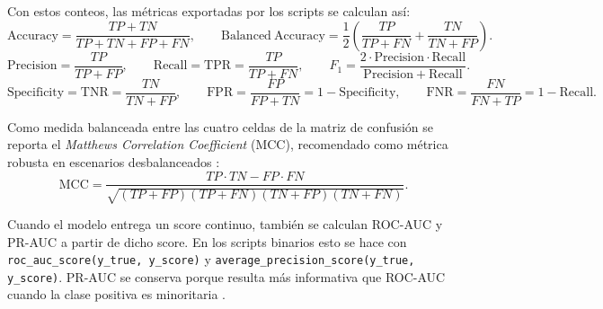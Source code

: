 \documentclass[12pt,oneside]{report}
\begin{document}
Con estos conteos, las métricas exportadas por los scripts se calculan así:
\[
\mathrm{Accuracy}=\frac{TP+TN}{TP+TN+FP+FN},\qquad
\mathrm{Balanced\ Accuracy}=\frac{1}{2}\left(\frac{TP}{TP+FN}+\frac{TN}{TN+FP}\right).
\]
\[
\mathrm{Precision}=\frac{TP}{TP+FP},\qquad
\mathrm{Recall}=\mathrm{TPR}=\frac{TP}{TP+FN},\qquad
F_1=\frac{2\cdot \mathrm{Precision}\cdot \mathrm{Recall}}{\mathrm{Precision}+\mathrm{Recall}}.
\]
\[
\mathrm{Specificity}=\mathrm{TNR}=\frac{TN}{TN+FP},\qquad
\mathrm{FPR}=\frac{FP}{FP+TN}=1-\mathrm{Specificity},\qquad
\mathrm{FNR}=\frac{FN}{FN+TP}=1-\mathrm{Recall}.
\]

Como medida balanceada entre las cuatro celdas de la matriz de confusión se reporta el \textit{Matthews Correlation Coefficient} (MCC),
recomendado como métrica robusta en escenarios desbalanceados \cite{chicco_mcc}:
\[
\mathrm{MCC}=\frac{TP\cdot TN - FP\cdot FN}{\sqrt{(TP+FP)(TP+FN)(TN+FP)(TN+FN)}}.
\]

Cuando el modelo entrega un score continuo, también se calculan ROC-AUC y PR-AUC a partir de dicho score. En los scripts binarios esto se hace con
\texttt{roc\_auc\_score(y\_true, y\_score)} y \texttt{average\_precision\_score(y\_true, y\_score)}. PR-AUC se conserva porque resulta más informativa que ROC-AUC cuando la clase positiva es minoritaria \cite{saito_pr_auc}.
\end{document}
